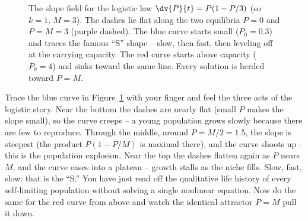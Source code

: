 \begin{figure}[H]
\centering
{}
\caption{The slope field for the logistic law $\dv{P}{t}=P(1-P/3)$ (so $k=1$, $M=3$). The dashes lie flat along the two equilibria $P=0$ and $P=M=3$ (purple dashed). The blue curve starts small ($P_0=0.3$) and traces the famous ``S'' shape -- slow, then fast, then leveling off at the carrying capacity. The red curve starts above capacity ($P_0=4$) and sinks toward the same line. Every solution is herded toward $P=M$.}
\label{ch36:fig-logistic}
\end{figure}

\begin{walkbox}
Trace the blue curve in Figure~\ref{ch36:fig-logistic} with your finger and feel the three acts of the logistic story. Near the bottom the dashes are nearly flat (small $P$ makes the slope small), so the curve creeps -- a young population grows slowly because there are few to reproduce. Through the middle, around $P=M/2 = 1.5$, the slope is steepest (the product $P(1-P/M)$ is maximal there), and the curve shoots up -- this is the population explosion. Near the top the dashes flatten again as $P$ nears $M$, and the curve eases into a plateau -- growth stalls as the niche fills. Slow, fast, slow: that is the ``S.'' You have just read off the qualitative life history of every self-limiting population without solving a single nonlinear equation. Now do the same for the red curve from above and watch the identical attractor $P=M$ pull it down.
\end{walkbox}


